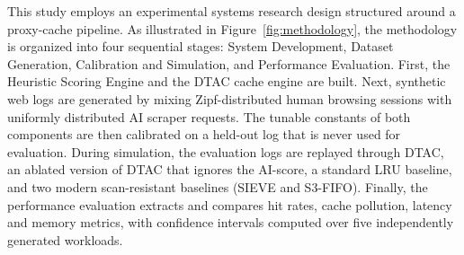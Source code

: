 This study employs an experimental systems research design structured around a proxy-cache pipeline. As illustrated in Figure~\ref{fig:methodology}, the methodology is organized into four sequential stages: System Development, Dataset Generation, Calibration and Simulation, and Performance Evaluation. First, the Heuristic Scoring Engine and the DTAC cache engine are built. Next, synthetic web logs are generated by mixing Zipf-distributed human browsing sessions with uniformly distributed AI scraper requests. The tunable constants of both components are then calibrated on a held-out log that is never used for evaluation. During simulation, the evaluation logs are replayed through DTAC, an ablated version of DTAC that ignores the AI-score, a standard LRU baseline, and two modern scan-resistant baselines (SIEVE and S3-FIFO). Finally, the performance evaluation extracts and compares hit rates, cache pollution, latency and memory metrics, with confidence intervals computed over five independently generated workloads.

